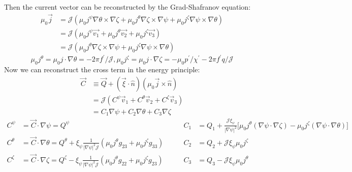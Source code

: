 \documentclass[10pt,a4paper]{article}
\numberwithin{equation}{section}
\begin{document}
Then the current vector can be reconstructed by the Grad-Shafranov equation:
\begin{align}
\mu_0 \vec{j} &= \mathcal{J} (\mu_0 j^{\psi} \nabla \theta \times \nabla \zeta + \mu_0 j^{\theta} \nabla \zeta \times \nabla \psi + \mu_0 j^{\zeta} \nabla \psi \times \nabla \theta) \\
&= \mathcal{J} (\mu_0 j^{\psi} \vec{v_1} + \mu_0 j^{\theta} \vec{v_2} + \mu_0 j^{\zeta} \vec{v_3})\\
&=\mathcal{J} (\mu_0 j^{\theta} \nabla \zeta \times \nabla \psi + \mu_0 j^{\zeta} \nabla \psi \times \nabla \theta)
\end{align}
\begin{equation}
    \mu_0 j^\theta = \mu_0 j \cdot \nabla \theta = - 2 \pi f^\prime / \mathcal{J}, \mu_0 j^\zeta = \mu_0 j \cdot \nabla \zeta = - \mu_0 p^\prime / \chi^\prime - 2 \pi f^\prime q / \mathcal{J}
\end{equation}
Now we can reconstruct the cross term in the energy principle:
\begin{align}
\vec{C} &\equiv \vec{Q} + (\vec{\xi} \cdot \hat{n} ) (\mu_0 \vec{j} \times \hat{n}) \\
&= \mathcal{J} ( C^\psi \vec{v}_1 + C^\theta \vec{v}_2 + C^\zeta \vec{v}_3 )\\
&=C_1 \nabla\psi + C_2 \nabla\theta + C_3 \nabla\zeta
\end{align}
\begin{equation}
\begin{aligned}
C^\psi   &= \vec{C}\cdot\nabla\psi   = Q^\psi 
&\qquad
C_1 &= Q_1 + \frac{\mathcal{J}\xi_\psi}{|\nabla\psi|^2}
\bigl[ \mu_0 j^\theta (\nabla\psi\cdot\nabla\zeta)
- \mu_0 j^\zeta (\nabla\psi\cdot\nabla\theta) \bigr] \\
C^\theta &= \vec{C}\cdot\nabla\theta = Q^\theta + \xi_\psi \frac{1}{|\nabla\psi|^2 \mathcal{J}}(\mu_0j^\theta g_{23} + \mu_0j^\zeta g_{33})
&\qquad
C_2 &= Q_2 + \mathcal{J}\xi_\psi \mu_0 j^\zeta \\
C^\zeta  &= \vec{C}\cdot\nabla\zeta  = Q^\zeta - \xi_\psi \frac{1}{|\nabla\psi|^2 \mathcal{J}}(\mu_0j^\theta g_{22} + \mu_0j^\zeta g_{23})
&\qquad
C_3 &= Q_3 - \mathcal{J}\xi_\psi \mu_0 j^\theta
\end{aligned}
\end{equation}
\end{document}
